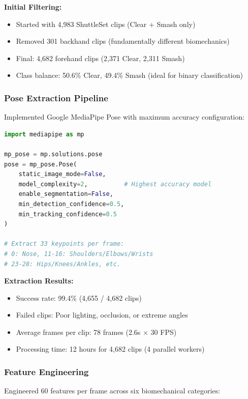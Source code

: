 \documentclass[11pt,a4paper]{article}
\begin{document}
\textbf{Initial Filtering:}
\begin{itemize}
\item Started with 4,983 ShuttleSet clips (Clear + Smash only)
\item Removed 301 backhand clips (fundamentally different biomechanics)
\item Final: 4,682 forehand clips (2,371 Clear, 2,311 Smash)
\item Class balance: 50.6\% Clear, 49.4\% Smash (ideal for binary classification)
\end{itemize}

\subsubsection{Pose Extraction Pipeline}

Implemented Google MediaPipe Pose \cite{MediaPipe} with maximum accuracy configuration:

\begin{lstlisting}[language=Python, caption=MediaPipe Configuration]
import mediapipe as mp

mp_pose = mp.solutions.pose
pose = mp_pose.Pose(
    static_image_mode=False,
    model_complexity=2,          # Highest accuracy model
    enable_segmentation=False,
    min_detection_confidence=0.5,
    min_tracking_confidence=0.5
)

# Extract 33 keypoints per frame:
# 0: Nose, 11-16: Shoulders/Elbows/Wrists
# 23-28: Hips/Knees/Ankles, etc.
\end{lstlisting}

\textbf{Extraction Results:}
\begin{itemize}
\item Success rate: 99.4\% (4,655 / 4,682 clips)
\item Failed clips: Poor lighting, occlusion, or extreme angles
\item Average frames per clip: 78 frames (2.6s $\times$ 30 FPS)
\item Processing time: 12 hours for 4,682 clips (4 parallel workers)
\end{itemize}

\subsubsection{Feature Engineering}

Engineered 60 features per frame across six biomechanical categories:
\end{document}
